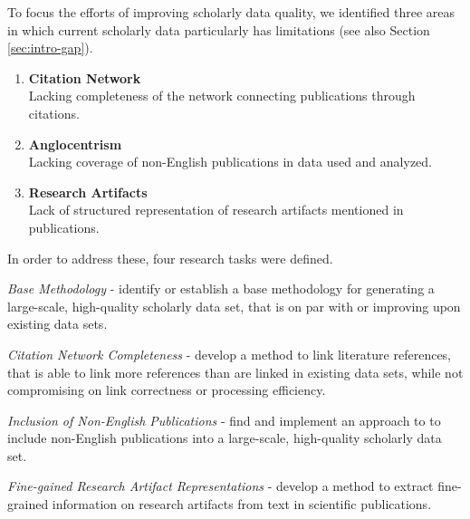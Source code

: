 To focus the efforts of improving scholarly data quality, we identified three areas in which current scholarly data particularly has limitations (see also Section \ref{sec:intro-gap}).

\begin{enumerate}
    \item \textbf{Citation Network}\\
          Lacking completeness of the network connecting publications through citations.
    \item \textbf{Anglocentrism}\\
          Lacking coverage of non-English publications in data used and analyzed.
    \item \textbf{Research Artifacts}\\
           Lack of structured representation of research artifacts mentioned in publications.
\end{enumerate}

In order to address these, four research tasks were defined.

\begin{rtlist}
    \item \textit{Base Methodology} - identify or establish a base methodology for generating a large-scale, high-quality scholarly data set, that is on par with or improving upon existing data sets.
    \item \textit{Citation Network Completeness} - develop a method to link literature references, that is able to link more references than are linked in existing data sets, while not compromising on link correctness or processing efficiency.
    \item \textit{Inclusion of Non-English Publications} - find and implement an approach to to include non-English publications into a large-scale, high-quality scholarly data set.
    \item \textit{Fine-gained Research Artifact Representations} - develop a method to extract fine-grained information on research artifacts from text in scientific publications.
\end{rtlist}

